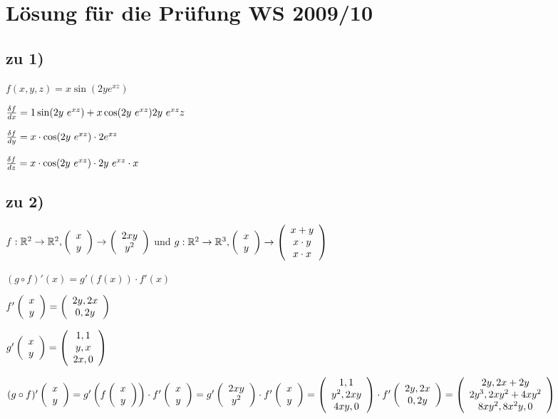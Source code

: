 \renewcommand{\ldate}{2016-01-14}


\section{Lösung für die Prüfung WS 2009/10}

\subsection{zu 1)}
$ f(x,y,z) = x \sin(2y e^{xz}) $ 

$ \frac{\df}{dx} = 1 \sin(2y\ e^{xz}) + x \cos(2y\ e^{xz}) 2y\ e^{xz} z $

$ \frac{\df}{dy} = x\cdot \cos(2y\ e^{xz}) \cdot 2e^{xz} $

$ \frac{\df}{dz} = x \cdot \cos(2y\ e^{xz}) \cdot 2y\ e^{xz} \cdot x $

\subsection{zu 2)}
$ f: \R^2 \rightarrow \R^2, \vektor{x\\y} \rightarrow \vektor{2xy\\y^2} $ und $ g: \R^2 \rightarrow \R^3, \vektor{x\\y} \rightarrow \vektor{x+y\\x\cdot y\\x\cdot x} $

$ (g\circ f)'(x) = g'(f(x)) \cdot f'(x) $

$ f'\vektor{x\\y} = \vektor{2y, 2x\\0, 2y} $

$ g'\vektor{x\\y} = \vektor{1, 1\\y, x\\2x, 0} $

$ (g\circ f)'\vektor{x\\y} = g' \rbr{f\vektor{x\\y}} \cdot f'\vektor{x\\y} 
= g'\vektor{2xy\\y^2} \cdot f'\vektor{x\\y}
= \vektor{1, 1\\y^2, 2xy\\4xy, 0} \cdot f'\vektor{2y, 2x\\0, 2y}
= \vektor{2y, 2x + 2y\\2y^3, 2xy^2 + 4xy^2\\8xy^2, 8x^2y, 0}
$

